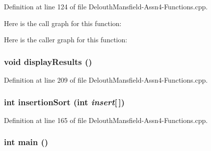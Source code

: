Definition at line 124 of file DelouthMansfield-\/Assn4-\/Functions.cpp.



Here is the call graph for this function:



Here is the caller graph for this function:

\hypertarget{_delouth_mansfield-_assn4-_functions_8cpp_ad6cced161336750300edfabbe2f387a9}{
\subsubsection[{displayResults}]{\setlength{\rightskip}{0pt plus 5cm}void displayResults ()}}
\label{_delouth_mansfield-_assn4-_functions_8cpp_ad6cced161336750300edfabbe2f387a9}


Definition at line 209 of file DelouthMansfield-\/Assn4-\/Functions.cpp.

\hypertarget{_delouth_mansfield-_assn4-_functions_8cpp_abdd451b9bf57eb321b817db4405d65fd}{
\subsubsection[{insertionSort}]{\setlength{\rightskip}{0pt plus 5cm}int insertionSort (int {\em insert}\mbox{[}$\,$\mbox{]})}}
\label{_delouth_mansfield-_assn4-_functions_8cpp_abdd451b9bf57eb321b817db4405d65fd}


Definition at line 165 of file DelouthMansfield-\/Assn4-\/Functions.cpp.

\hypertarget{_delouth_mansfield-_assn4-_functions_8cpp_ae66f6b31b5ad750f1fe042a706a4e3d4}{
\subsubsection[{main}]{\setlength{\rightskip}{0pt plus 5cm}int main ()}}
\label{_delouth_mansfield-_assn4-_functions_8cpp_ae66f6b31b5ad750f1fe042a706a4e3d4}


